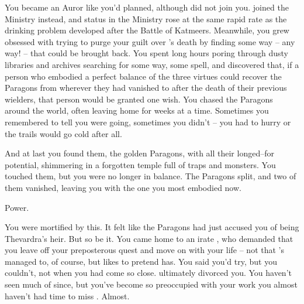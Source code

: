 \documentclass[char]{Katmeers}
\begin{document}
You became an Auror like you'd planned, although \cRon{} did not join you. \cRon{\They} joined the Ministry instead, and \cRon{\their} status in the Ministry rose at the same rapid rate as the drinking problem \cRon{\they} developed after the Battle of Katmeers. Meanwhile, you grew obsessed with trying to purge your guilt over \cHarry{}'s death by finding some way -- any way! -- that \cHarry{\they} could be brought back. You spent long hours poring through dusty libraries and archives searching for some way, some spell, and discovered that, if a person who embodied a perfect balance of the three virtues could recover the Paragons from wherever they had vanished to after the death of their previous wielders, that person would be granted one wish. You chased the Paragons around the world, often leaving home for weeks at a time. Sometimes you remembered to tell \cRon{} you were going, sometimes you didn't -- you had to hurry or the trails would go cold after all.

And at last you found them, the golden Paragons, with all their longed--for potential, shimmering in a forgotten temple full of traps and monsters. You touched them, but you were no longer in balance. The Paragons split, and two of them vanished, leaving you with the one you most embodied now.

Power.

You were mortified by this. It felt like the Paragons had just accused you of being Thevardra's heir. But so be it. You came home to an irate \cRon{}, who demanded that you leave off your preposterous quest and move on with your life -- not that \cRon{\they}'s managed to, of course, but \cRon{\they} likes to pretend \cRon{\they} has. You said you'd try, but you couldn't, not when you had come so close. \cRon{} ultimately divorced you. You haven't seen much of \cRon{\them} since, but you've become so preoccupied with your work you almost haven't had time to miss \cRon{\them}. Almost.
\end{document}
